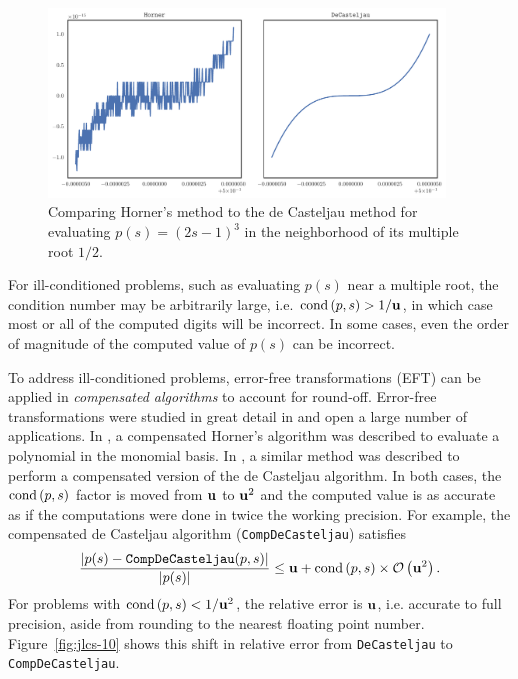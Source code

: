 \begin{figure}
  \includegraphics[width=0.9375\textwidth]{../images/k-compensated/horner_inferior.pdf}
  \centering
  \captionsetup{width=.75\linewidth}
  \caption{Comparing Horner's method to the de Casteljau method for
    evaluating \(p(s) = (2s - 1)^3\) in the neighborhood of its
    multiple root \(1/2\).}
  \label{fig:horner-inferior}
\end{figure}

For ill-conditioned problems, such as evaluating \(p(s)\) near a
multiple root, the condition number may be arbitrarily large, i.e.
\(\operatorname{cond}\left(p, s\right) > 1 / \mathbf{u}\), in
which case most or all of the computed digits will be incorrect.
In some cases, even the order of magnitude of the computed value
of \(p(s)\) can be incorrect.

To address ill-conditioned problems, error-free transformations (EFT) can
be applied in \textit{compensated algorithms} to account for round-off.
Error-free transformations were studied in great detail in \cite{Ogita2005}
and open a large number of applications.
In \cite{langlois_et_al:DSP:2006:442}, a compensated Horner's algorithm was
described to evaluate a polynomial in the monomial basis. In \cite{Jiang2010},
a similar method was described to perform a compensated version of the de
Casteljau algorithm. In both cases, the \(\operatorname{cond}\left(p, s\right)\) factor is moved
from \(\mathbf{u}\) to \(\mathbf{u}^2\) and the computed value is as accurate
as if the computations were done in twice the working precision. For example,
the compensated de Casteljau algorithm (\texttt{CompDeCasteljau}) satisfies
\begin{equation}\label{de-casteljau-2-error}
  \frac{\left|p(s) - \mathtt{CompDeCasteljau}(p, s)\right|}{
    \left|p(s)\right|} \leq \mathbf{u} + \operatorname{cond}\left(p, s\right) \times
    \mathcal{O}\left(\mathbf{u}^2\right).
\end{equation}
For problems with \(\operatorname{cond}\left(p, s\right) < 1 / \mathbf{u}^2\), the relative error
is \(\mathbf{u}\), i.e. accurate to full precision, aside from rounding to the
nearest floating point number. Figure~\ref{fig:jlcs-10} shows this shift
in relative error from \texttt{DeCasteljau} to \texttt{CompDeCasteljau}.

